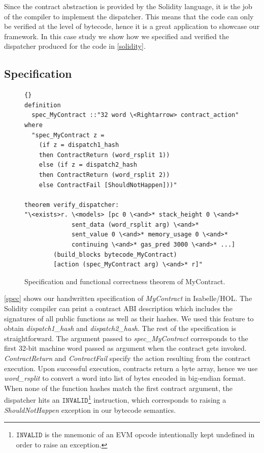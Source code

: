 \documentclass[sigplan,10pt,review]{acmart}\settopmatter{printfolios=true,printccs=false,printacmref=false}
\newcommand{\instr}[1]{\mathtt{#1}}
\begin{document}
Since the contract abstraction is provided by the Solidity language,
it is the job of the compiler to implement the dispatcher.
This means that the code can only be verified at the level of bytecode,
hence it is a great application to showcase our framework.
In this case study we show how we specified and verified the
dispatcher produced for the code in \autoref{solidity}.
%

\subsection{Specification}

\begin{figure}[h]
\begin{lstlisting}[language=Isar]{}
definition 
  spec_MyContract ::"32 word \<Rightarrow> contract_action"
where
  "spec_MyContract z = 
	(if z = dispatch1_hash 
	then ContractReturn (word_rsplit 1))
	else (if z = dispatch2_hash 
	then ContractReturn (word_rsplit 2))
	else ContractFail [ShouldNotHappen]))"

theorem verify_dispatcher:
"\<exists>r. \<models> [pc 0 \<and>* stack_height 0 \<and>*
             sent_data (word_rsplit arg) \<and>*
             sent_value 0 \<and>* memory_usage 0 \<and>*
             continuing \<and>* gas_pred 3000 \<and>* ...]
        (build_blocks bytecode_MyContract)
        [action (spec_MyContract arg) \<and>* r]"
\end{lstlisting}
\caption{Specification and functional correctness theorem of MyContract.}
\label{spec}
\end{figure}

\autoref{spec} shows our handwritten specification of \textit{MyContract} in Isabelle/HOL.
The Solidity compiler can print a contract ABI description which includes the
signatures of all public functions as well as their hashes.
We used this feature to obtain \textit{dispatch1\_hash} and \textit{dispatch2\_hash}.
The rest of the specification is straightforward.
The argument passed to \textit{spec\_MyContract} corresponds to the first 32-bit
machine word passed as argument when the contract gets invoked.
\textit{ContractReturn} and \textit{ContractFail} specify the action
resulting from the contract execution.
Upon successful execution, contracts return a byte array,
hence we use \textit{word\_rsplit} to convert a word into list of bytes
encoded in big-endian format.
When none of the function hashes match the first contract argument,
the dispatcher hits an $\instr{INVALID}$\footnote{$\instr{INVALID}$ is the mnemonic
of an EVM opcode intentionally kept undefined in order to raise an exception.} instruction,
which corresponds to raising a \textit{ShouldNotHappen} exception
in our bytecode semantics.
\end{document}
